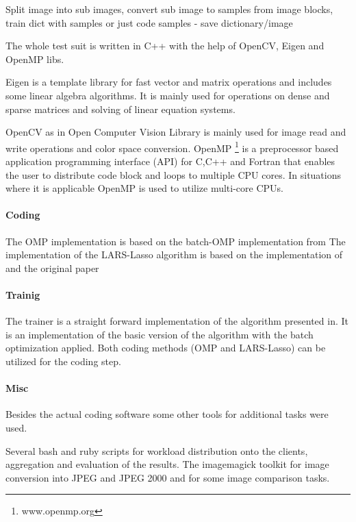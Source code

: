 Split image into sub images, convert sub image to samples from image blocks, 
train dict with samples or just code samples - save dictionary/image

The whole test suit is written in C++ with the help  of OpenCV, Eigen and OpenMP libs.

Eigen\cite{Eigen} is a template library for fast vector and matrix operations 
and includes some linear algebra algorithms. It is mainly used for operations on
dense and sparse matrices and solving of linear equation systems.

OpenCV\cite{OpenCV} as in Open Computer Vision Library is mainly used for
image read and write operations and color space conversion. OpenMP
\footnote{www.openmp.org\cite{OpenMP}} is a preprocessor based application
programming interface (API) for C,C++ and Fortran that enables the user to
distribute code block and loops to multiple CPU cores. In situations where it is
applicable OpenMP is used to utilize multi-core CPUs. 

\paragraph{Coding}
The OMP implementation is based on the batch-OMP implementation
from\cite{Rubinstein} The implementation of the LARS-Lasso algorithm is based on
the implementation of\cite{Strand2005} and the original paper\cite{Efron2004}

\paragraph{Trainig}
The \trainDL trainer is a straight forward implementation of the
algorithm presented in\cite{Mairal2010}. It is an implementation of the basic
version of the algorithm with the batch optimization applied. Both coding
methods (OMP and LARS-Lasso) can be utilized for the coding step.

\paragraph{Misc}
 Besides the actual coding software some other tools for
additional tasks were used.

Several bash and ruby scripts for workload distribution onto the
clients, aggregation and evaluation of the results. The imagemagick toolkit for
image conversion into JPEG and JPEG 2000 and for some image comparison tasks.








